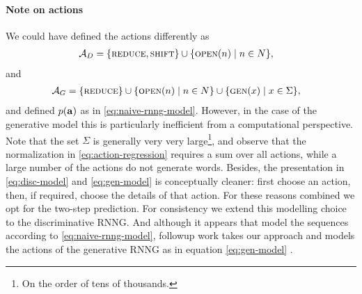 
\paragraph{Note on actions} We could have defined the actions differently as
\begin{align*}
  \mathcal{A}_D &= \{ \textsc{reduce}, \textsc{shift} \} \cup \{ \textsc{open}(n) \mid n \in N \},
\end{align*}
and
\begin{align*}
  \mathcal{A}_G &= \{ \textsc{reduce} \} \cup \{ \textsc{open}(n) \mid n \in N \} \cup \{ \textsc{gen}(x) \mid x \in \Sigma \},
\end{align*}
and defined $p(\mathbf{a})$ as in \ref{eq:naive-rnng-model}. However, in the case of the generative model this is particularly inefficient from a computational perspective. Note that the set $\Sigma$ is generally very very large\footnote{On the order of tens of thousands.}, and observe that the normalization in \ref{eq:action-regression} requires a sum over all actions, while a large number of the actions do not generate words. Besides, the presentation in \ref{eq:disc-model} and \ref{eq:gen-model} is conceptually cleaner: first choose an action, then, if required, choose the details of that action. For these reasons combined we opt for the two-step prediction. For consistency we extend this modelling choice to the discriminative RNNG. And although it appears that \citet{dyer2016rnng} model the sequences according to \ref{eq:naive-rnng-model}, followup work takes our approach and models the actions of the generative RNNG as in equation \ref{eq:gen-model} \citep{hale2018beam}.


